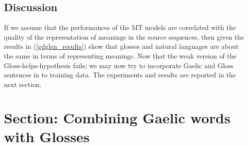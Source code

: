 \documentclass[a4paper]{article}
\begin{document}
\subsection{Discussion}
If we assume that the performances of the MT models are correlated with the quality of the representation of meanings in the source sequences, then given the results in (\ref{gdglen_results}) show that glosses and natural languages are about the same in terms of representing meanings. 
Now that the weak version of the Gloss-helps-hypothesis fails; we may now try to incorporate Gaelic and Gloss sentences in to training data. The experiments and results are reported in the next section. 

\section{Section: Combining Gaelic words with Glosses }\label{gd_plus_gl_to_en}
\end{document}
